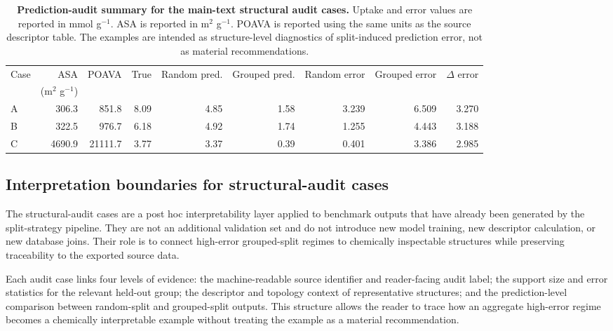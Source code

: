 \documentclass[11pt,a4paper]{article}
\begin{document}
\begin{table}[H]
\centering
\caption{\textbf{Prediction-audit summary for the main-text structural audit cases.}
Uptake and error values are reported in mmol g$^{-1}$. ASA is reported in m$^2$ g$^{-1}$. POAVA is
reported using the same units as the source descriptor table. The examples are intended as
structure-level diagnostics of split-induced prediction error, not as material recommendations.}
\label{tab:structural_audit_predictions}
\small
\setlength{\tabcolsep}{4pt}
\begin{tabular}{@{}p{}rrrrrrrr@{}}
\toprule
Case & ASA & POAVA & True & Random pred. & Grouped pred. & Random error & Grouped error & $\Delta$ error \\
 & (m$^2$ g$^{-1}$) &  &  &  &  &  &  &  \\
\midrule
A & 306.3  & 851.8   & 8.09 & 4.85 & 1.58 & 3.239 & 6.509 & 3.270 \\
B & 322.5  & 976.7   & 6.18 & 4.92 & 1.74 & 1.255 & 4.443 & 3.188 \\
C & 4690.9 & 21111.7 & 3.77 & 3.37 & 0.39 & 0.401 & 3.386 & 2.985 \\
\bottomrule
\end{tabular}
\end{table}

\subsection[Structural-audit interpretation boundaries]{Interpretation boundaries for structural-audit cases}
\label{sec:si_structural_audit_boundaries}

The structural-audit cases are a post hoc interpretability layer applied to benchmark outputs that have already been generated by the split-strategy pipeline. They are not an additional validation set and do not introduce new model training, new descriptor calculation, or new database joins. Their role is to connect high-error grouped-split regimes to chemically inspectable structures while preserving traceability to the exported source data.

Each audit case links four levels of evidence: the machine-readable source identifier and reader-facing audit label; the support size and error statistics for the relevant held-out group; the descriptor and topology context of representative structures; and the prediction-level comparison between random-split and grouped-split outputs. This structure allows the reader to trace how an aggregate high-error regime becomes a chemically interpretable example without treating the example as a material recommendation.
\end{document}
